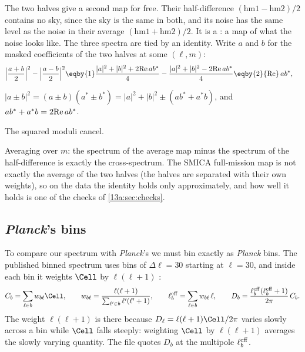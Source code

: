 The two halves give a second map for free. Their half-difference $(\text{hm1}-\text{hm2})/2$ contains no sky,
since the sky is the same in both, and its noise has the same level as the noise in their average
$(\text{hm1}+\text{hm2})/2$. It is a : a map of what the noise looks like. The three
spectra are tied by an identity. Write $a$ and $b$ for the masked coefficients of the two halves at
some $(\ell,m)$:
\begin{align}
  \Bigl|\frac{a+b}2\Bigr|^2-\Bigl|\frac{a-b}2\Bigr|^2
  &\eqby{1}\frac{|a|^2+|b|^2+2{\rm Re}\,ab^*}4-\frac{|a|^2+|b|^2-2{\rm Re}\,ab^*}4
  \eqby{2}{\rm Re}\,ab^* ,
  \label{13a:eq:cross-identity}
\end{align}
\begin{explain}
  \item $|a\pm b|^2=(a\pm b)(a^*\pm b^*)=|a|^2+|b|^2\pm(ab^*+a^*b)$, and $ab^*+a^*b=2{\rm Re}\,ab^*$.
  \item The squared moduli cancel.
\end{explain}
Averaging over $m$: the spectrum of the average map minus the spectrum of the half-difference is exactly the
cross-spectrum. The SMICA full-mission map is not exactly the average of the two halves (the halves
are separated with their own weights), so on the data the identity holds only approximately, and how well it
holds is one of the checks of \cref{13a:sec:checks}.

\subsection{\textit{Planck}'s bins}
\label{13a:sec:bins}

To compare our spectrum with \textit{Planck}'s we must bin exactly as \textit{Planck} bins. The published
binned spectrum uses bins of $\Delta\ell=30$ starting at $\ell=30$, and inside each bin it weights $\Cell$ by
$\ell(\ell+1)$ \cite[(22)]{Planck2018V}:
\begin{equation}
  C_b=\sum_{\ell\in b}w_{b\ell}\Cell,\qquad w_{b\ell}=\frac{\ell(\ell+1)}{\sum_{\ell'\in b}\ell'(\ell'+1)},\qquad
  \ell_b^{\rm eff}=\sum_{\ell\in b}w_{b\ell}\,\ell,\qquad
  D_b=\frac{\ell_b^{\rm eff}(\ell_b^{\rm eff}+1)}{2\pi}\,C_b .
  \label{13a:eq:planck-bin}
\end{equation}
The weight $\ell(\ell+1)$ is there because $D_\ell=\ell(\ell+1)\Cell/2\pi$ varies slowly across a bin while $\Cell$
falls steeply: weighting $\Cell$ by $\ell(\ell+1)$ averages the slowly varying quantity. The file quotes $D_b$ at
the multipole $\ell_b^{\rm eff}$.

